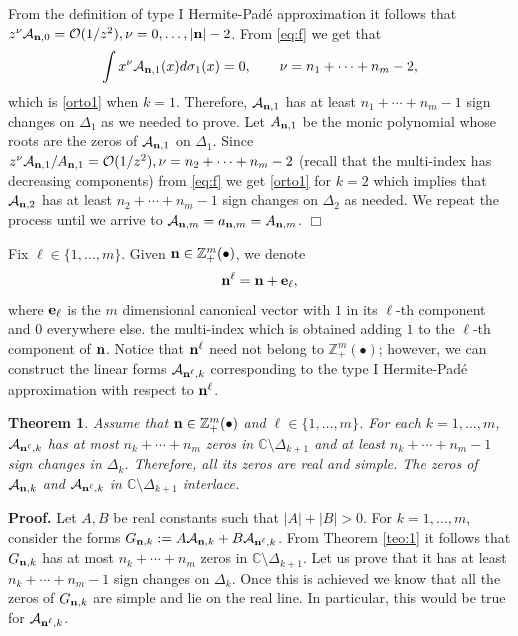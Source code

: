 \documentclass{amsart}
\newtheorem{teo}{\sc Theorem}[section]
\theoremstyle{definition}
\theoremstyle{remark}
\begin{document}
From the definition of type I Hermite-Pad\'e approximation it follows that $z^{\nu}{\mathcal{A}}_{{\bf n},0} = {\mathcal{O}}(1/z^2), \nu = 0,\ldots,|{\bf n}| -2$. From \eqref{eq:f} we get that
\[\int x^\nu {\mathcal{A}}_{{\bf n},1}(x) d \sigma_1 (x)  = 0, \qquad \nu =  n_1+\cdots+n_m -2,
\]
which is \eqref{orto1} when $k=1$. Therefore, ${\mathcal{A}}_{{\bf n},1}$ has at least $n_1+\cdots+n_m -1$ sign changes on $\Delta_1$ as we needed to prove. Let $A_{{\bf n},1}$ be the monic polynomial whose roots are the zeros of ${\mathcal{A}}_{{\bf n},1}$ on $\Delta_1$. Since $z^\nu {\mathcal{A}}_{{\bf n},1}/A_{{\bf n},1} = {\mathcal{O}}(1/z^2), \nu = n_2+\cdots+n_m -2$ (recall that the multi-index has decreasing components) from \eqref{eq:f} we get \eqref{orto1} for $k=2$ which implies that ${\mathcal{A}}_{{\bf n},2}$ has at least $n_2+\cdots+n_m -1$ sign changes on $\Delta_2$ as needed. We repeat the process until we arrive to ${\mathcal{A}}_{{\bf n},m} =a_{{\bf n},m} = A_{{\bf n},m}$. \hfill $\Box$

\medskip

Fix $\ell \in \{1,\ldots,m\}$. Given ${\bf n} \in {\mathbb{Z}}_+^{m}(\bullet)$, we denote
\[{\bf n}^{\ell} = {\bf n} + {\bf e}_\ell,
\]
where ${\bf e}_\ell$ is the $m$ dimensional canonical vector with $1$ in its $\ell$-th component and $0$ everywhere else.
the multi-index which is obtained adding $1$ to the $\ell$-th component of ${\bf n}$.  Notice that ${\bf n}^{\ell}$ need not belong to ${\mathbb{Z}}_+^{m}(\bullet)$; however, we can construct the linear forms ${\mathcal{A}}_{{\bf n}^{\ell},k}$ corresponding to the type I Hermite-Pad\'e approximation with respect to  ${\bf n}^\ell$.

\begin{teo} \label{teo:4} Assume that ${\bf n} \in {\mathbb{Z}}_+^{m}(\bullet)$ and $\ell \in \{1,\ldots,m\}$. For each $k=1,\ldots,m$,   ${\mathcal{A}}_{{\bf n}^\ell,k}$ has at most   $n_k+\cdots+n_m$ zeros in  ${\mathbb{C}} \setminus \Delta_{k+1}$ and at least $n_k+\cdots+n_m-1$ sign changes in $\Delta_k$. Therefore, all its zeros are real and simple. The zeros of ${\mathcal{A}}_{{\bf n},k}$ and ${\mathcal{A}}_{{\bf n}^\ell,k}$ in  ${\mathbb{C}} \setminus \Delta_{k+1}$ interlace.
\end{teo}
{\bf Proof.} Let $A,B$ be real constants such that $|A|+|B| > 0$. For $k=1,\ldots,m$, consider the forms $G_{{\bf n},k}:= A {\mathcal{A}}_{{\bf n},k} + B{\mathcal{A}}_{{\bf n}^\ell,k}$. From Theorem \ref{teo:1} it follows that $G_{{\bf n},k}$ has at most $n_k+\cdots+n_m$ zeros in  ${\mathbb{C}} \setminus \Delta_{k+1}$. Let us prove that it has at least $n_k+\cdots+n_m -1$ sign changes on $\Delta_k$. Once this is achieved we know that all the zeros of $G_{{\bf n},k}$ are simple and lie on the real line. In particular, this would be true for ${\mathcal{A}}_{{\bf n}^\ell,k}$.
\end{document}
